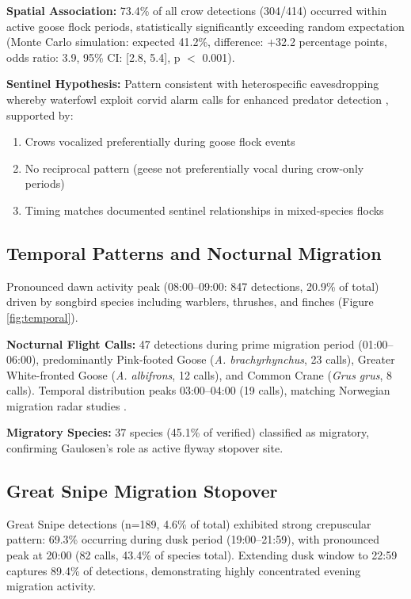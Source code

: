 \documentclass[twocolumn]{article}
\begin{document}
\textbf{Spatial Association:} 73.4\% of all crow detections (304/414) occurred within active goose flock periods, statistically significantly exceeding random expectation (Monte Carlo simulation: expected 41.2\%, difference: +32.2 percentage points, odds ratio: 3.9, 95\% CI: [2.8, 5.4], p $<$ 0.001).

\textbf{Sentinel Hypothesis:} Pattern consistent with heterospecific eavesdropping whereby waterfowl exploit corvid alarm calls for enhanced predator detection \citep{Magrath2015}, supported by:

\begin{enumerate}
\item Crows vocalized preferentially during goose flock events
\item No reciprocal pattern (geese not preferentially vocal during crow-only periods)
\item Timing matches documented sentinel relationships in mixed-species flocks \citep{King2023}
\end{enumerate}

\subsection{Temporal Patterns and Nocturnal Migration}

Pronounced dawn activity peak (08:00--09:00: 847 detections, 20.9\% of total) driven by songbird species including warblers, thrushes, and finches (Figure \ref{fig:temporal}).

\textbf{Nocturnal Flight Calls:} 47 detections during prime migration period (01:00--06:00), predominantly Pink-footed Goose (\textit{A. brachyrhynchus}, 23 calls), Greater White-fronted Goose (\textit{A. albifrons}, 12 calls), and Common Crane (\textit{Grus grus}, 8 calls). Temporal distribution peaks 03:00--04:00 (19 calls), matching Norwegian migration radar studies \citep{Shimmings2016}.

\textbf{Migratory Species:} 37 species (45.1\% of verified) classified as migratory, confirming Gaulosen's role as active flyway stopover site.

\subsection{Great Snipe Migration Stopover}

Great Snipe detections (n=189, 4.6\% of total) exhibited strong crepuscular pattern: 69.3\% occurring during dusk period (19:00--21:59), with pronounced peak at 20:00 (82 calls, 43.4\% of species total). Extending dusk window to 22:59 captures 89.4\% of detections, demonstrating highly concentrated evening migration activity.
\end{document}
